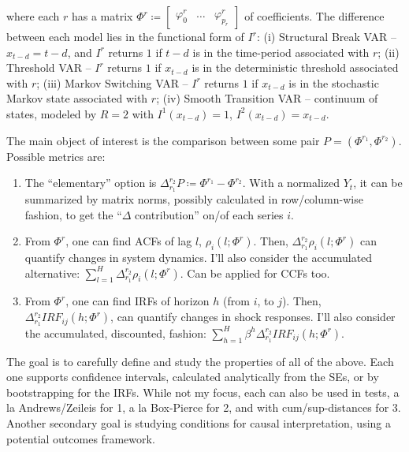 \documentclass[11pt, a4paper]{article}
\begin{document}
\noindent where each $r$ has a matrix $\Phi^r \coloneqq \begin{bmatrix} \varphi^r_0 & \dots & \varphi^r_{p_r} \end{bmatrix}$ of coefficients. The difference between each model lies in the functional form of $I^r$: (i) Structural Break VAR -- $x_{t-d} = t-d$, and $I^r$ returns $1$ if $t-d$ is in the time-period associated with $r$; (ii) Threshold VAR -- $I^r$ returns $1$ if $x_{t-d}$ is in the deterministic threshold associated with $r$; (iii) Markov Switching VAR -- $I^r$ returns $1$ if $x_{t-d}$ is in the stochastic Markov state associated with $r$; (iv) Smooth Transition VAR -- continuum of states, modeled by $R = 2$ with $I^1(x_{t-d}) = 1$, $I^2(x_{t-d}) = x_{t-d}$.%

The main object of interest is the comparison between some pair $P = (\Phi^{r_1}, \Phi^{r_2})$. Possible metrics are:

\begin{enumerate}
    \item The ``elementary'' option is $\Delta^{r_2}_{r_1} P \coloneqq \Phi^{r_1} - \Phi^{r_2}$. With a normalized $Y_t$, it can be summarized by matrix norms, possibly calculated in row/column-wise fashion, to get the ``$\Delta$ contribution'' on/of each series $i$.
    \item From $\Phi^{r}$, one can find ACFs of lag $l$, $\rho_{i}(l; \Phi^{r})$. Then, $\Delta^{r_2}_{r_1} \rho_{i}(l; \Phi^{r})$ can quantify changes in system dynamics. I'll also consider the accumulated alternative: $\sum_{l = 1}^H \Delta^{r_2}_{r_1} \rho_{i}(l; \Phi^{r})$. Can be applied for CCFs too.
    \item From $\Phi^{r}$, one can find IRFs of horizon $h$ (from $i$, to $j$). Then, $\Delta^{r_2}_{r_1} IRF_{ij}(h; \Phi^{r})$, can quantify changes in shock responses. I'll also consider the accumulated, discounted, fashion: $\sum_{h = 1}^H \beta^h \Delta^{r_2}_{r_1} IRF_{ij}(h; \Phi^{r})$.
\end{enumerate}

The goal is to carefully define and study the properties of all of the above. Each one supports confidence intervals, calculated analytically from the SEs, or by bootstrapping for the IRFs. While not my focus, each can also be used in tests, a la Andrews\supercite{Andrews1993}/Zeileis\supercite{Zeileis2005}\supercite{Zeileis2010} for 1, a la Box-Pierce\supercite{Box1970} for 2, and with cum/sup-distances for 3. Another secondary goal is studying conditions for causal interpretation, using a potential outcomes framework\supercite{Rambachan2021}.
\end{document}

